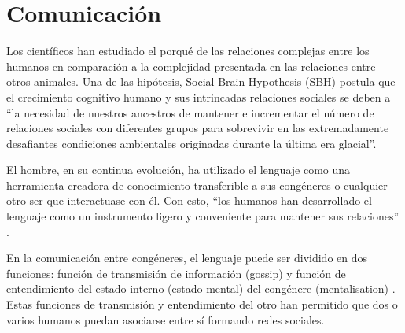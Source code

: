 \section{Comunicación}

Los científicos han estudiado el porqué de las relaciones complejas entre los humanos en comparación a la complejidad presentada en las relaciones entre otros animales. Una de las hipótesis, Social Brain Hypothesis (SBH) postula que el crecimiento cognitivo humano y sus intrincadas relaciones sociales se deben a “la necesidad de nuestros ancestros de mantener e incrementar el número de relaciones sociales con diferentes grupos para sobrevivir en las extremadamente desafiantes condiciones ambientales originadas durante la última era glacial”.\cite{dynamics}

El hombre, en su continua evolución, ha utilizado el lenguaje como una herramienta creadora de conocimiento transferible a sus congéneres o cualquier otro ser que interactuase con él. Con esto, “los humanos han desarrollado el lenguaje como un instrumento ligero y conveniente para mantener sus relaciones” \cite{dynamics}. 

En la comunicación entre congéneres, el lenguaje puede ser dividido en dos funciones: función de transmisión de información (gossip) y función de entendimiento del estado interno (estado mental) del congénere (mentalisation) \cite{dynamics}. Estas funciones de transmisión y entendimiento del otro han permitido que dos o varios humanos puedan asociarse entre sí formando redes sociales.

